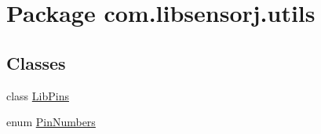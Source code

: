 \hypertarget{namespacecom_1_1libsensorj_1_1utils}{}\section{Package com.\+libsensorj.\+utils}
\label{namespacecom_1_1libsensorj_1_1utils}
\subsection*{Classes}
\begin{DoxyCompactItemize}
\item 
class \hyperlink{classcom_1_1libsensorj_1_1utils_1_1LibPins}{Lib\+Pins}
\item 
enum \hyperlink{enumcom_1_1libsensorj_1_1utils_1_1PinNumbers}{Pin\+Numbers}
\end{DoxyCompactItemize}
